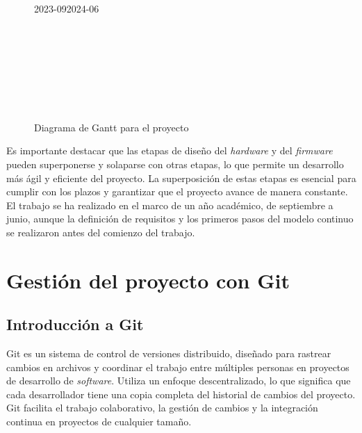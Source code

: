 \begin{landscape}
	\begin{figure}[H]
		\centering
		\begin{ganttchart}[
			hgrid,
			vgrid,
			y unit chart=0.7cm,
			x unit=1.5cm,
			time slot format=isodate-yearmonth,
			time slot unit=month,
			bar/.append style={fill=blue!30},
			bar label font=\footnotesize,
			group label font=\footnotesize,
    		newline shortcut=true,
			]{2023-09}{2024-06}
			 \\ %
			 \\
			 \\
			 \\
			 \\
			 \\
			 \\
			 \\
			
			\end{ganttchart}
			\caption{Diagrama de Gantt para el proyecto}	
	\end{figure}
\end{landscape}
	
\newpage

Es importante destacar que las etapas de diseño del \textit{hardware} y del \textit{firmware} pueden superponerse y solaparse con otras etapas, lo que permite un desarrollo más ágil y eficiente del proyecto. La superposición de estas etapas es esencial para cumplir con los plazos y garantizar que el proyecto avance de manera constante. El trabajo se ha realizado en el marco de un año académico, de septiembre a junio, aunque la definición de requisitos y los primeros pasos del modelo continuo se realizaron antes del comienzo del trabajo.

\section{Gestión del proyecto con Git}
\subsection{Introducción a Git}
Git es un sistema de control de versiones distribuido, diseñado para rastrear cambios en archivos y coordinar el trabajo entre múltiples personas en proyectos de desarrollo de \textit{software}. Utiliza un enfoque descentralizado, lo que significa que cada desarrollador tiene una copia completa del historial de cambios del proyecto. Git facilita el trabajo colaborativo, la gestión de cambios y la integración continua en proyectos de cualquier tamaño.

